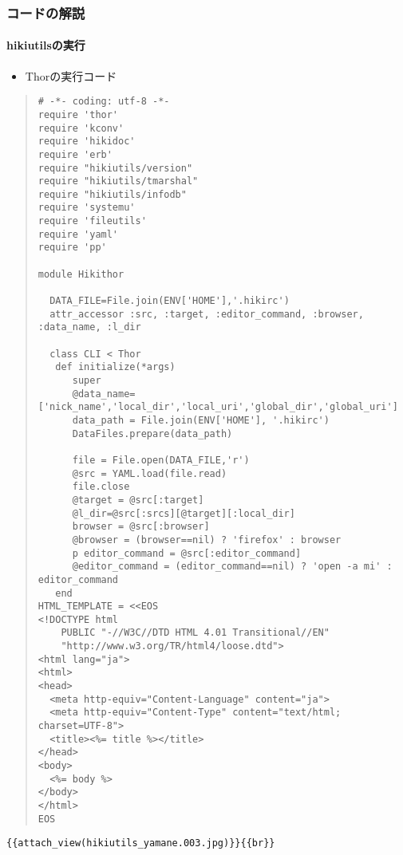 \documentclass[10pt,a4j]{article}
\begin{document}
\subsubsection{コードの解説}
\paragraph{hikiutilsの実行}
\begin{itemize}
\item Thorの実行コード
\end{itemize}\begin{quote}\begin{verbatim}
# -*- coding: utf-8 -*-                                                         
require 'thor'
require 'kconv'
require 'hikidoc'
require 'erb'
require "hikiutils/version"
require "hikiutils/tmarshal"
require "hikiutils/infodb"
require 'systemu'
require 'fileutils'
require 'yaml'
require 'pp'

module Hikithor

  DATA_FILE=File.join(ENV['HOME'],'.hikirc')
  attr_accessor :src, :target, :editor_command, :browser, :data_name, :l_dir

  class CLI < Thor
   def initialize(*args)
      super
      @data_name=['nick_name','local_dir','local_uri','global_dir','global_uri']
      data_path = File.join(ENV['HOME'], '.hikirc')
      DataFiles.prepare(data_path)

      file = File.open(DATA_FILE,'r')
      @src = YAML.load(file.read)
      file.close
      @target = @src[:target]
      @l_dir=@src[:srcs][@target][:local_dir]
      browser = @src[:browser]
      @browser = (browser==nil) ? 'firefox' : browser
      p editor_command = @src[:editor_command]
      @editor_command = (editor_command==nil) ? 'open -a mi' : editor_command
   end
HTML_TEMPLATE = <<EOS
<!DOCTYPE html                                                                  
    PUBLIC "-//W3C//DTD HTML 4.01 Transitional//EN"                             
    "http://www.w3.org/TR/html4/loose.dtd">                                     
<html lang="ja">                                                                
<html>                                                                          
<head>                                                                          
  <meta http-equiv="Content-Language" content="ja">                             
  <meta http-equiv="Content-Type" content="text/html; charset=UTF-8">           
  <title><%= title %></title>                                                   
</head>                                                                         
<body>
  <%= body %>                                                                   
</body>                                                                         
</html>                                                                         
EOS                                                                          
\end{verbatim}\end{quote}
\verb|{{attach_view(hikiutils_yamane.003.jpg)}}|\verb|{{br}}|
\end{document}
